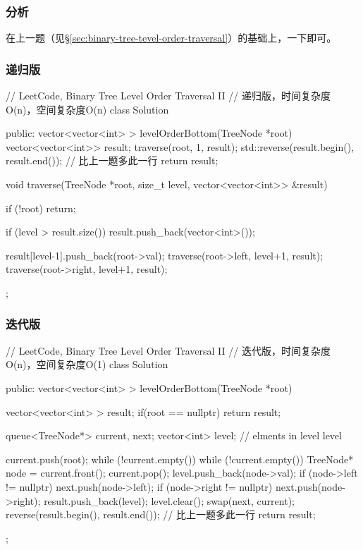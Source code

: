 \subsubsection{分析}
在上一题（见\S \ref{sec:binary-tree-tevel-order-traversal}）的基础上，一下即可。


\subsubsection{递归版}
\begin{Code}
// LeetCode, Binary Tree Level Order Traversal II
// 递归版，时间复杂度O(n)，空间复杂度O(n)
class Solution {
public:
    vector<vector<int> > levelOrderBottom(TreeNode *root) {
        vector<vector<int>> result;
        traverse(root, 1, result);
        std::reverse(result.begin(), result.end()); // 比上一题多此一行
        return result;
    }

    void traverse(TreeNode *root, size_t level, vector<vector<int>> &result) {
        if (!root) return;

        if (level > result.size())
            result.push_back(vector<int>());

        result[level-1].push_back(root->val);
        traverse(root->left, level+1, result);
        traverse(root->right, level+1, result);
    }
};
\end{Code}


\subsubsection{迭代版}
\begin{Code}
// LeetCode, Binary Tree Level Order Traversal II
// 迭代版，时间复杂度O(n)，空间复杂度O(1)
class Solution {
public:
    vector<vector<int> > levelOrderBottom(TreeNode *root) {
        vector<vector<int> > result;
        if(root == nullptr) return result;

        queue<TreeNode*> current, next;
        vector<int> level; // elments in level level

        current.push(root);
        while (!current.empty()) {
            while (!current.empty()) {
                TreeNode* node = current.front();
                current.pop();
                level.push_back(node->val);
                if (node->left != nullptr) next.push(node->left);
                if (node->right != nullptr) next.push(node->right);
            }
            result.push_back(level);
            level.clear();
            swap(next, current);
        }
        reverse(result.begin(), result.end()); // 比上一题多此一行
        return result;
    }
};
\end{Code}


